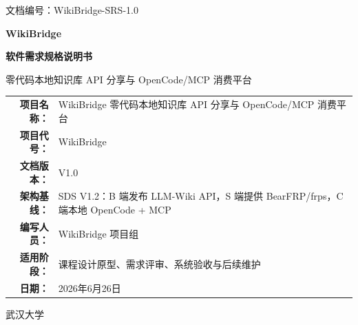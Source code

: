 \documentclass[UTF8,a4paper,12pt,fontset=fandol]{ctexart}
\newcommand{\docid}{WikiBridge-SRS-1.0}
\newcommand{\docdate}{2026年6月26日}
\begin{document}
\begin{titlepage}
  \thispagestyle{empty}
  \begin{flushleft}
    \small 文档编号：\docid
  \end{flushleft}
  \vspace*{2.2cm}
  \begin{center}
    {\bfseries WikiBridge\par}
    \vspace{0.5cm}
    {\bfseries 软件需求规格说明书\par}
    \vspace{0.8cm}
    {\large 零代码本地知识库 API 分享与 OpenCode/MCP 消费平台\par}
    \vspace{2.4cm}
    \begin{tabularx}{0.94\textwidth}{>{\bfseries}r Y}
      项目名称： & WikiBridge 零代码本地知识库 API 分享与 OpenCode/MCP 消费平台 \\
      项目代号： & WikiBridge \\
      文档版本： & V1.0 \\
      架构基线： & SDS V1.2：B 端发布 LLM-Wiki API，S 端提供 BearFRP/frps，C 端本地 OpenCode + MCP \\
      编写人员： & WikiBridge 项目组 \\
      适用阶段： & 课程设计原型、需求评审、系统验收与后续维护 \\
      日期： & \docdate \\
    \end{tabularx}
  \end{center}
  \vfill
  \begin{center}
    武汉大学
  \end{center}
\end{titlepage}

\end{document}
